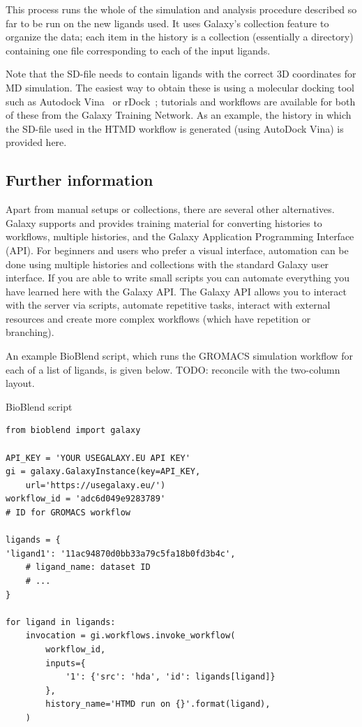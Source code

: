 \documentclass[twocolumn]{bmcart}%
\begin{document}
This process runs the whole of the simulation and analysis procedure described so far to be run on the new ligands used. It uses Galaxy's collection\cite{gtn_collections} feature to organize the data; each item in the history is a collection (essentially a directory) containing one file corresponding to each of the input ligands.

Note that the SD-file needs to contain ligands with the correct 3D coordinates for MD simulation. The easiest way to obtain these is using a molecular docking tool such as Autodock Vina~\cite{Trott2009} or rDock~\cite{Ruiz2014}; tutorials and workflows are available for both of these from the Galaxy Training Network. As an example, the history in which the SD-file used in the HTMD workflow is generated (using AutoDock Vina) is provided here\cite{eu_6hhr}.

\subsection*{Further information}

Apart from manual setups or collections, there are several other alternatives. Galaxy supports and provides training material for converting histories to workflows\cite{gtn_toworkflow}, multiple histories\cite{gtn_multiple}, and the Galaxy Application Programming Interface (API)\cite{gtn_api}. For beginners and users who prefer a visual interface, automation can be done using multiple histories and collections with the standard Galaxy user interface. If you are able to write small scripts you can automate everything you have learned here with the Galaxy API. The Galaxy API allows you to interact with the server via scripts, automate repetitive tasks, interact with external resources and create more complex workflows (which have repetition or branching).

An example BioBlend script, which runs the GROMACS simulation workflow for each of a list of ligands, is given below. TODO: reconcile with the two-column layout.

\begin{handson_box_colour}{BioBlend script}
\begin{verbatim} 
from bioblend import galaxy

API_KEY = 'YOUR USEGALAXY.EU API KEY'
gi = galaxy.GalaxyInstance(key=API_KEY,
    url='https://usegalaxy.eu/')
workflow_id = 'adc6d049e9283789' 
# ID for GROMACS workflow

ligands = {
'ligand1': '11ac94870d0bb33a79c5fa18b0fd3b4c',
    # ligand_name: dataset ID
    # ...
}

for ligand in ligands:
    invocation = gi.workflows.invoke_workflow(
        workflow_id,
        inputs={
            '1': {'src': 'hda', 'id': ligands[ligand]}
        },
        history_name='HTMD run on {}'.format(ligand),
    )
\end{verbatim}
\end{handson_box_colour}
\end{document}
